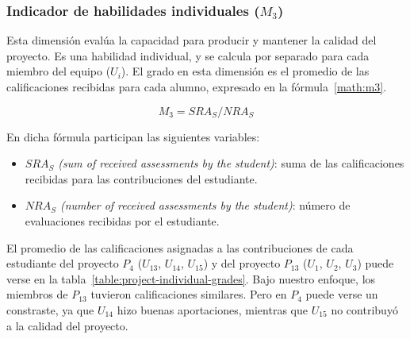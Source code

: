 
\subsubsection{Indicador de habilidades individuales ($M_3$)}

Esta dimensión evalúa la capacidad para producir y mantener la calidad del proyecto. Es una habilidad individual, y se calcula por separado para cada miembro del equipo ($U_i$). El grado en esta dimensión es el promedio de las calificaciones recibidas para cada alumno, expresado en la fórmula~\ref{math:m3}.

\begin{equation}
    \textbf{$M_3 = SRA_S/NRA_S$}
    \label{math:m3}
\end{equation}

En dicha fórmula participan las siguientes variables:
\begin{itemize}	
	\item \emph{$SRA_S$ (sum of received assessments by the student)}: suma de las calificaciones recibidas para las contribuciones del estudiante.
	\item \emph{$NRA_S$ (number of received assessments by the student)}: número de evaluaciones recibidas por el estudiante.
\end{itemize} 

El promedio de las calificaciones asignadas a las contribuciones de cada estudiante del proyecto $P_4$ ($U_{13}$, $U_{14}$, $U_{15}$) y del proyecto $P_{13}$ ($U_1$, $U_2$, $U_3$) puede verse en la tabla~\ref{table:project-individual-grades}. Bajo nuestro enfoque, los miembros de $P_{13}$ tuvieron calificaciones similares. Pero en $P_4$ puede verse un constraste, ya que $U_{14}$ hizo buenas aportaciones, mientras que $U_{15}$ no contribuyó a la calidad del proyecto.

